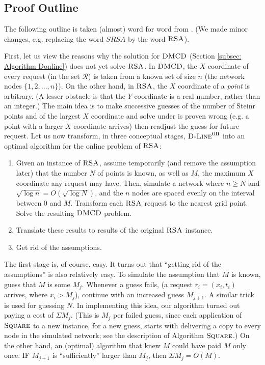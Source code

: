 \documentclass[11pt]{article}
\newcommand{\DMCD}{\mbox{\sc DMCD}}
\newcommand{\RSA}{\mbox{\sc RSA}}
\newcommand{\calR}{\mathcal{R}}
\newcommand{\Square}[0]{\mbox{\sc Square}}
\newcommand{\NN}{N}
\newcommand{\Dlineon}[0]{\mbox{{\sc D-Line}}^{\mbox{\upshape on}}}
\begin{document}
\subsection{Proof Outline}
\label{App;subsec:Proof Outline}
The following outline is taken (almost) word for word from \cite{KK2014}.
(We made minor changes, e.g. replacing the word $SRSA$ by the word $\RSA$).

First, let us view the reasons why the  solution for $\DMCD$ (Section \ref{subsec: Algorithm Donline}) does not yet solve $\RSA$.
In $\DMCD$,  the $X$ coordinate of every request (in the set $\calR$) is taken from a known set of size $n$ (the network nodes $\{1,2, ... , n\}$).
On the other hand, in $\RSA$, the $X$ coordinate of a {\em point} is arbitrary.
(A lesser obstacle is that the $Y$ coordinate is a real number, rather than an integer.)
The main idea is to make successive guesses of the number of Steinr points and of the largest $X$ coordinate and solve under is proven wrong
(e.g. a point with a larger $X$ coordinate arrives) then readjust the guess for future request.
Let us now transform, in three conceptual stages, $\Dlineon$ into an optimal algorithm for the online problem of $\RSA$:
\vspace{-0.2cm}
\begin{enumerate}
     \item Given an instance of $\RSA$, assume temporarily (and remove the assumption later) that the number $N$ of points is known, as well as $M$, the maximum $X$ coordinate any request may have. Then, simulate a network where $n\geq \NN$ and $\sqrt{\log n}=O(\sqrt{\log \NN})$, and the $n$ nodes are spaced evenly on the interval between $0$ and $M$. Transform each $\RSA$ request to the nearest grid point. Solve the resulting $\DMCD$ problem.

     \item Translate  these results to results of the original
           $\RSA$ instance.

\item  Get rid of the assumptions.
\end{enumerate}
\vspace{-0.2cm}
The first stage is, of course, easy. It turns out that ``getting rid of the assumptions'' is also relatively easy.
To simulate the assumption that $M$ is known, guess that $M$ is some $M_j$.
Whenever a guess fails, (a request $r_i=(x_i,t_i)$ arrives, where $x_i>M_j$), continue with an increased guess $M_{j+1}$.
A similar trick is used for guessing $N$. In implementing this idea, our algorithm turned out paying a cost of $\Sigma M_j$.
(This is $M_j$ per failed guess, since each application of $\Square$ to a new instance, for a new guess, starts with delivering a copy to every node in the simulated network; see the description of Algorithm $\Square$.) On the other hand, an (optimal) algorithm that knew $M$ could have paid $M$ only once.
IF $M_{j+1}$ is ``sufficiently'' larger than $M_j$, then $\Sigma M_j=O(M)$.
\end{document}
